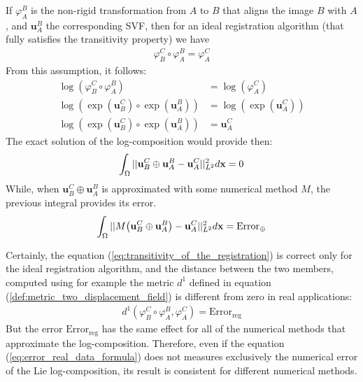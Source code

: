 If $\varphi_{A}^{B}$ is the non-rigid transformation from $A$ to $B$ that aligns the image $B$ with $A$, and $\mathbf{u}_{A}^{B}$ the corresponding SVF, then for an ideal registration algorithm (that fully satisfies the transitivity property) we have
\begin{align}\label{eq:transitivity_of_the_registration}
\varphi_{B}^{C} \circ \varphi_{A}^{B} = \varphi_{A}^{C}  
\end{align}
From this assumption, it follows:
\begin{align*}
\log(\varphi_{B}^{C} \circ \varphi_{A}^{B}) &= \log(\varphi_{A}^{C}  ) \\
\log(\exp(\mathbf{u}_{B}^{C}) \circ \exp(\mathbf{u}_{A}^{B})) &= \log(\exp(\mathbf{u}_{A}^{C}  ) ) \\
\log(\exp(\mathbf{u}_{B}^{C}) \circ \exp(\mathbf{u}_{A}^{B})) &= \mathbf{u}_{A}^{C}  
\end{align*}
The exact solution of the log-composition would provide then:
\begin{align*}
\int_{\Omega} \vert\lvert 
	\mathbf{u}_{B}^{C} \oplus \mathbf{u}_{A}^{B}
	-
	\mathbf{u}_{A}^{C}
 \rvert\vert_{L^2}^{2} d\mathbf{x} 
 =
 0
\end{align*} 
While, when $\mathbf{u}_{B}^{C} \oplus \mathbf{u}_{A}^{B}$ is approximated with some numerical method $M$, the previous integral provides its error.
\begin{align}\label{eq:error_real_data_formula} 
\int_{\Omega} \vert\lvert 
	M\big(\mathbf{u}_{B}^{C} \oplus \mathbf{u}_{A}^{B} \big)
	-
	\mathbf{u}_{A}^{C}
 \rvert\vert_{L^2}^{2} d\mathbf{x} 
=
\text{Error}_{\oplus}
\end{align} 

Certainly, the equation (\ref{eq:transitivity_of_the_registration}) is correct only for the ideal registration algorithm, and the distance between the two members, computed using for example the metric $d^{1}$ defined in equation (\ref{def:metric_two_displacement_field}) is different from zero in real applications:
\begin{align*}
d^{1}(\varphi_{B}^{C} \circ \varphi_{A}^{B} ,\varphi_{A}^{C}) 
= 
\text{Error}_{\text{reg}}
\end{align*} 
But the error $\text{Error}_{\text{reg}}$ has the same effect for all of the numerical methods that approximate the log-composition. Therefore, even if the equation (\ref{eq:error_real_data_formula}) does not measures exclusively the numerical error of the Lie log-composition, its result is consistent for different numerical methods.

